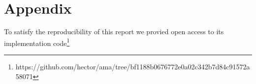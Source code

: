 \documentclass{article}
\begin{document}
\section{Appendix}

To satisfy the reproducibility of this report we provied open access to its implementation code\footnote{https://github.com/hector/ama/tree/bf1188b0676772e0a02c342b7d84c91572a58071}

%
%
%
%
%
\end{document}
